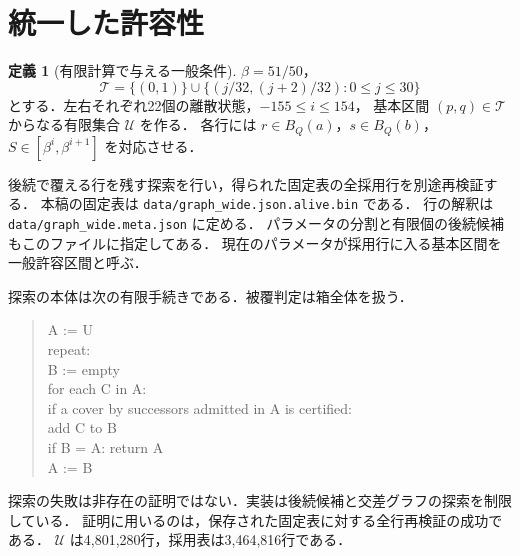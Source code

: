 \documentclass[10pt,a4paper]{article}
\theoremstyle{definition}
\newtheorem{definition}{定義}
\newcommand{\file}[1]{{\small\nolinkurl{#1}}}
\begin{document}
\section{統一した許容性}
\begin{definition}[有限計算で与える一般条件]\label{def:general}
$\beta=51/50$，
\[
 \mathcal T=\{(0,1)\}\cup
       \{(j/32,(j+2)/32):0\le j\le30\}
\]
とする．左右それぞれ22個の離散状態，$-155\le i\le154$，
基本区間 $(p,q)\in\mathcal T$ からなる有限集合 $\mathcal U$ を作る．
各行には $r\in B_Q(a)$，$s\in B_Q(b)$，$S\in[\beta^i,\beta^{i+1}]$ を対応させる．

後続で覆える行を残す探索を行い，得られた固定表の全採用行を別途再検証する．
本稿の固定表は \file{data/graph_wide.json.alive.bin} である．
行の解釈は \file{data/graph_wide.meta.json} に定める．
パラメータの分割と有限個の後続候補もこのファイルに指定してある．
現在のパラメータが採用行に入る基本区間を一般許容区間と呼ぶ．
\end{definition}

探索の本体は次の有限手続きである．被覆判定は箱全体を扱う．
\begin{quote}\small\ttfamily
A := U\\
repeat:\\
\quad B := empty\\
\quad for each C in A:\\
\qquad if a cover by successors admitted in A is certified:\\
\qquad\quad add C to B\\
\quad if B = A: return A\\
\quad A := B
\end{quote}
探索の失敗は非存在の証明ではない．実装は後続候補と交差グラフの探索を制限している．
証明に用いるのは，保存された固定表に対する全行再検証の成功である．
$\mathcal U$ は4,801,280行，採用表は3,464,816行である．
\end{document}
